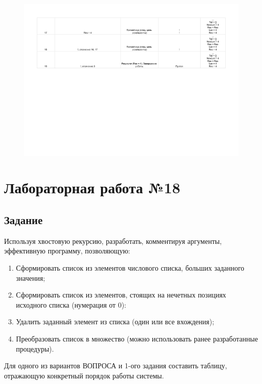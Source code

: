 \documentclass[12pt]{report}
\begin{document}
\begin{figure}[H]
	\begin{center}
		\includegraphics[scale=0.7]{imgs/table_17-3.pdf}
	\end{center}
\end{figure}

\chapter*{Лабораторная работа №18}

\section*{Задание}

Используя хвостовую рекурсию, разработать, комментируя аргументы, эффективную программу, позволяющую:

\begin{enumerate}
	\item Сформировать список из элементов числового списка, больших заданного значения;
	\item Сформировать список из элементов, стоящих на нечетных позициях исходного списка (нумерация от 0):
	\item Удалить заданный элемент из списка (один или все вхождения);
	\item Преобразовать список в множество (можно использовать ранее разработанные процедуры).
\end{enumerate}

Для одного из вариантов ВОПРОСА и 1-ого задания составить таблицу, отражающую конкретный порядок работы системы.
\end{document}
